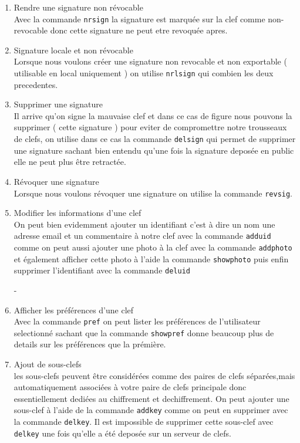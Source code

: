 \begin{enumerate}
\item Rendre une signature non révocable\\
Avec la commande \texttt{nrsign} la signature est marquée sur la clef comme non-revocable donc cette signature ne peut etre 
revoquée apres.

\item Signature locale et non révocable\\
Lorsque nous voulons créer une signature non revocable et non exportable ( utilisable en local uniquement ) on utilise \texttt{nrlsign}
 qui combien les deux precedentes.
\item Supprimer une signature\\
Il arrive qu'on signe la mauvaise clef et dans ce cas de figure nous pouvons la supprimer ( cette signature )  pour eviter de compromettre
 notre trousseaux de clefs, on utilise dans ce cas la commande \texttt{delsign} qui permet de supprimer une signature sachant bien
 entendu qu'une fois la signature deposée en public elle ne peut plus être  retractée.
\item Révoquer une signature\\
Lorsque nous voulons révoquer une signature on utilise la commande \texttt{revsig}.
\item Modifier les informations d'une clef\\
On peut bien evidemment ajouter un identifiant c'est à dire un nom une adresse email et un commentaire à notre clef avec 
la commande \texttt{adduid} comme on peut aussi  ajouter une photo à la clef avec la commande \texttt{addphoto} et également afficher 
cette photo à l'aide la commande \texttt{showphoto} puis enfin supprimer l'identifiant avec la commande \texttt{deluid}

-\item Afficher les préférences d'une clef\\
Avec la commande \texttt{pref} on peut lister les préférences de l'utilisateur selectionné sachant que la commande \texttt{showpref}
 donne beaucoup plus de details sur les préférences que la prémière.
\item Ajout de sous-clefs\\
les sous-clefs peuvent être considérées comme des paires de clefs séparées,mais automatiquement associées à votre paire de clefs 
principale donc essentiellement dediées au chiffrement et dechiffrement.
On peut ajouter une sous-clef à l'aide de la commande \texttt{addkey} comme on peut en supprimer avec la commande \texttt{delkey}.
Il est impossible de supprimer cette sous-clef avec \texttt{delkey} une fois qu'elle a été deposée sur un serveur de clefs.


\end{enumerate}
